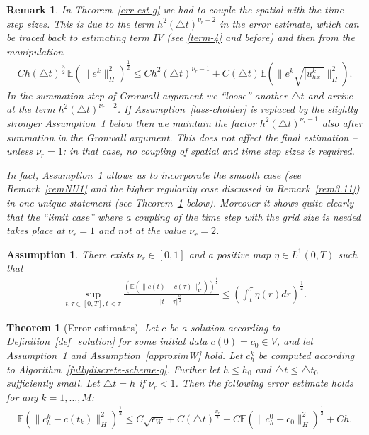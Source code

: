 \documentclass[a4paper,10pt]{article}
\newtheorem{teo}[cor]{Theorem}
\newtheorem{rem}[cor]{Remark}
\newtheorem{ass}[cor]{Assumption}
\numberwithin{equation}{section}
\begin{document}
\begin{rem}
In Theorem~\ref{err-est-g} we had to couple the spatial with the time step sizes. This is due to the term $h^{2} (\triangle t)^{\nu_{r} -2}$ in the error estimate, which can be traced back to estimating term $IV$ (see \eqref{term-4} and before) and then from the manipulation
\begin{align*}
Ch (\triangle t)^{\frac{\nu_{r}}{2}} \mathbb{E}(\| e^{k}\|_{H}^{2})^{\frac{1}{2}} \leq
Ch^{2} (\triangle t)^{\nu_{r}-1} + C(\triangle t) \mathbb{E} ( \| e^{k}\sqrt{|u^{k}_{hx}|} \|^{2}_{H}) .
\end{align*}
In the summation step of Gronwall argument we ``loose'' another $\triangle t$ and arrive at the term $h^{2} (\triangle t)^{\nu_{r} -2}$.
If Assumption~\ref{lass-cholder} is replaced by the slightly stronger Assumption~\ref{lass-cholder-strong} below then we maintain the factor $h^{2} (\triangle t)^{\nu_{r} -1}$ also after summation in the Gronwall argument.
This does not affect the final estimation -- unless $\nu_{r}=1$: in that case, no coupling of spatial and time step sizes is required.

In fact, Assumption~\ref{lass-cholder-strong} allows us to incorporate the smooth case (see Remark~\ref{remNU1} and the higher regularity case discussed in Remark~\ref{rem3.11}) in one unique statement (see Theorem~\ref{err-est-g-2} below). Moreover it shows quite clearly that the ``limit case'' where a coupling of the time step with the grid size is needed takes place at $\nu_{r}=1$ and not at the value $\nu_{r}=2$.
\end{rem}
\begin{ass}\label{lass-cholder-strong}
There exists $\nu_{r} \in [0,1]$ and a positive map $\eta \in L^{1}(0,T)$ such that
 \begin{align}\label{ass-cholder-strong}
 \sup_{t, \tau \in [0,T], t < \tau} \frac{(\mathbb{E}(\| c(t) - c(\tau) \|_{V}^{2}))^{\frac{1}{2}}}{|t -\tau|^{\frac{\nu_{r}}{2} }} \leq (\int_{t}^{\tau} \eta(r) dr )^{\frac{1}{2}}.
 \end{align}
\end{ass}
\begin{teo}[Error estimates] \label{err-est-g-2}
Let $c$ be a solution according to Definition~\ref{def_solution} for some initial data $c(0)=c_{0} \in V$, and let Assumption~\ref{lass-cholder-strong} and Assumption~\ref{approximW} hold. Let $c_{h}^{k}$ be computed according to Algorithm~\ref{fullydiscrete-scheme-g}.
Further let $h \leq h_{0}$ and $\triangle t \leq \triangle t_{0}$ sufficiently small.
Let $\triangle t=h$ if $\nu_{r}<1$.
Then the following error estimate holds for any $k=1, \ldots, M$:
\begin{align*}
\mathbb{E}(\|c^{k}_{h}- c(t_{k})\|_{H}^{2})^{\frac{1}{2}}\leq C \sqrt{\epsilon_{W}} + C (\triangle t)^{\frac{\nu_{r}}{2}} + C \mathbb{E}( \|c^{0}_{h}- c_{0}\|_{H}^{2})^{\frac{1}{2}}+Ch.
\end{align*}
\end{teo}
\end{document}
